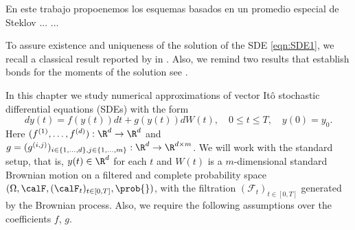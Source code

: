 \documentclass[sort&compress, preprint]{elsarticle}
\theoremstyle{definition}
\newtheorem{hypothesis}{Hypothesis}[section]
\theoremstyle{plain}%
\theoremstyle{remark}
\newcommand{\innerprod}[2]{\left\langle#1, #2\right\rangle}
\begin{document}
En este trabajo propoenemos los esquemas basados en un promedio especial de Steklov \cite{Diaz-Infante2015}
... ... 

To assure existence and uniqueness of the solution of the SDE \eqref{eqn:SDE1}, we recall a 
classical result reported by \citeauthor*{Mao2013} in \cite{Mao2013}.  Also, we remind two results that establish bonds
for the moments of the solution see \cite{Higham2002b,Mao2007}.

	In this chapter we  study numerical approximations of vector It\^o stochastic differential equations (SDEs) with 
the form
\begin{equation}\label{eqn:SDE1}
	dy(t)
	=f(y(t))dt + g(y(t))dW(t), \quad 0\leq t\leq T,
	\quad y(0)=y_0.
\end{equation}
Here $(f^{(1)},\dots, f^{(d)}):\R^d \to \R^d$ and 
$g = (g^{(i,j)})_{i\in \{1,\dots,d\}, j\in\{1,\dots, m\}}:\R^d \to \R^{d\times m}$.
We will work with the standard setup, that is,  $y(t)\in \R^d$ for each $t$ and  $W(t)$ is a
$m$-dimensional standard Brownian motion on a filtered and complete probability space
$
	(
		\Omega ,\calF,(\calF_t)_{t\in[0,T]},\prob{}
	)
$,
with the filtration
$(\mathcal{F}_t)_{t\in[0,T]}$  generated by the Brownian process.
%
Also, we require the following assumptions over the coefficients 
	$f %
	$,
	$
		g %
	$.
\end{document}

